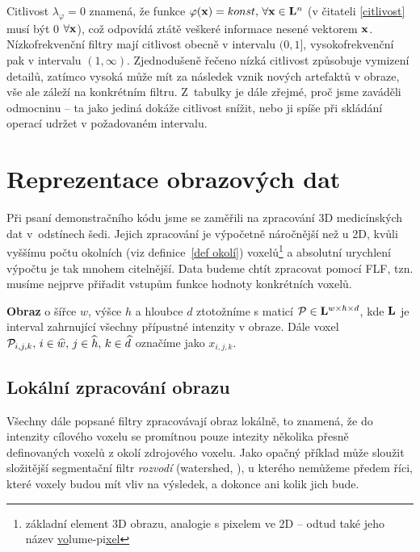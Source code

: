 Citlivost $\lambda_\varphi = 0$ znamená, že funkce $\varphi(\mathbf{x}) = konst, \, \forall \mathbf{x} \in \mathbf{L}^n$ (v čitateli \eqref{citlivost} musí být 0 $\forall \mathbf{x}$), což odpovídá ztátě veškeré informace nesené vektorem $\mathbf{x}$. Nízkofrekvenční filtry mají citlivost obecně v intervalu $(0,1]$, vysokofrekvenční pak v intervalu $(1,\infty)$. Zjednodušeně řečeno nízká citlivost způsobuje vymizení detailů, zatímco vysoká může mít za následek vznik nových artefaktů v obraze, vše ale záleží na konkrétním filtru. Z~tabulky je dále zřejmé, proč jsme zaváděli odmocninu -- ta jako jediná dokáže citlivost snížit, nebo ji spíše při skládání operací udržet v požadovaném intervalu. 


\section{Reprezentace obrazových dat}

Při psaní demonstračního kódu jsme se zaměřili na zpracování 3D medicínských dat v~odstínech šedi. Jejich zpracování je výpočetně náročnější než u 2D, kvůli vyššímu počtu okolních (viz definice~\ref{def okolí}) voxelů\footnote{základní element 3D obrazu, analogie s pixelem ve 2D -- odtud také jeho název \bq \underline{vo}lume-pi\underline{xel}\eq} a absolutní urychlení výpočtu je tak mnohem citelnější. Data budeme chtít zpracovat pomocí FLF, tzn. musíme nejprve přiřadit vstupům funkce hodnoty konkrétních voxelů.

\begin{define}\label{def obraz}
  \textbf{Obraz} o šířce $w$, výšce $h$ a hloubce $d$ ztotožníme s maticí $\mathcal{P} \in \mathbf{L}^{w\times h\times d}$, kde $\mathbf{L}$ je interval zahrnující všechny přípustné intenzity v obraze. Dále voxel $\mathcal{P}_{i,j,k}, \,i \in \widehat w, \,j \in \widehat h, \,k \in \widehat d$ označíme jako $x_{i,j,k}$.
\end{define}

    \subsection{Lokální zpracování obrazu}\label{lokální zprac}
    Všechny dále popsané filtry zpracovávají obraz lokálně, to znamená, že do intenzity cílového voxelu se promítnou pouze intezity několika přesně definovaných voxelů z okolí zdrojového voxelu. Jako opačný příklad může sloužit složitější segmentační filtr \emph{rozvodí} (watershed, \cite{Charypar}), u kterého nemůžeme předem říci, které voxely budou mít vliv na výsledek, a dokonce ani kolik jich bude.

